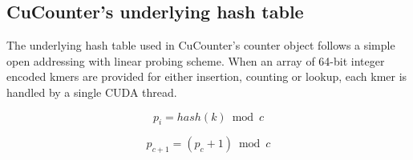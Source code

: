 \subsection*{CuCounter's underlying hash table}
The underlying hash table used in CuCounter's counter object follows a simple open addressing with linear probing scheme.
When an array of 64-bit integer encoded kmers are provided for either insertion, counting or lookup, each kmer is handled by a single CUDA thread.


\noindent\begin{minipage}{.495\linewidth}
\begin{equation}
  p_i=hash(k) \bmod c
\end{equation}
\end{minipage}
\begin{minipage}{.5\linewidth}
\begin{equation}
  p_{c+1}=(p_c+1) \bmod c
\end{equation}
\end{minipage}


